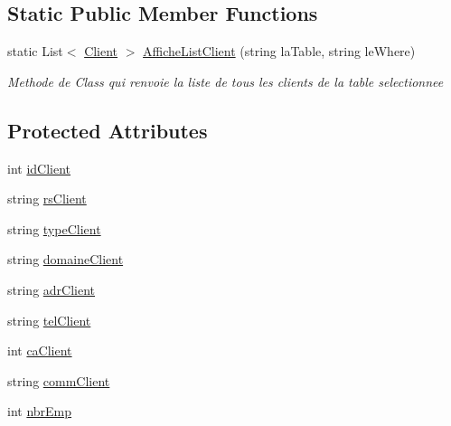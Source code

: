 \subsection*{Static Public Member Functions}
\begin{DoxyCompactItemize}
\item 
static List$<$ \mbox{\hyperlink{class_d_b___projet___active_1_1_client}{Client}} $>$ \mbox{\hyperlink{class_d_b___projet___active_1_1_client_a8e91e3e3afbd47eebe254efff03bddea}{Affiche\+List\+Client}} (string la\+Table, string le\+Where)
\begin{DoxyCompactList}\small\item\em Methode de Class qui renvoie la liste de tous les clients de la table selectionnee \end{DoxyCompactList}\end{DoxyCompactItemize}
\subsection*{Protected Attributes}
\begin{DoxyCompactItemize}
\item 
int \mbox{\hyperlink{class_d_b___projet___active_1_1_client_affe3303a6d27c7a7f654230b3a4f7cc9}{id\+Client}}
\item 
string \mbox{\hyperlink{class_d_b___projet___active_1_1_client_a62cce6b940e51d6be71f86e9976ba1a9}{rs\+Client}}
\item 
string \mbox{\hyperlink{class_d_b___projet___active_1_1_client_a6d4762a2879d6d1f87ba892ee93860a4}{type\+Client}}
\item 
string \mbox{\hyperlink{class_d_b___projet___active_1_1_client_a19345606d726120d7a4c907b5dc2165b}{domaine\+Client}}
\item 
string \mbox{\hyperlink{class_d_b___projet___active_1_1_client_a0462bb0d99bf949c3b7c5e162f98c473}{adr\+Client}}
\item 
string \mbox{\hyperlink{class_d_b___projet___active_1_1_client_a456c769feb18b9f136e89f53e6d648d3}{tel\+Client}}
\item 
int \mbox{\hyperlink{class_d_b___projet___active_1_1_client_a744749ad4839568118e307e8694624fb}{ca\+Client}}
\item 
string \mbox{\hyperlink{class_d_b___projet___active_1_1_client_a1b4f833561ba622dd1e8e7acd2672fd7}{comm\+Client}}
\item 
int \mbox{\hyperlink{class_d_b___projet___active_1_1_client_a14acac4dbf39569432ce0ef2c96bdca4}{nbr\+Emp}}
\end{DoxyCompactItemize}
